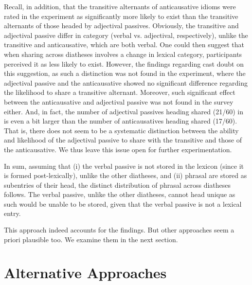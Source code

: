 \documentclass[output=paper]{langsci/langscibook}
\begin{document}
Recall, in addition, that the transitive alternants of anticausative idioms
were rated in the  experiment as significantly more likely to exist than
the transitive alternants of those headed by adjectival passives. Obviously,
the transitive and adjectival passive differ in category (verbal vs.
adjectival, respectively), unlike the transitive and anticausative, which are
both verbal. One could then suggest that when sharing across diatheses involves
a change in lexical category, participants perceived it as less likely to
exist. However, the findings regarding  cast doubt on this
suggestion, as such a distinction was not found in the  experiment,
where the adjectival passive and the anticausative showed no significant
difference regarding the likelihood to share a transitive alternant. Moreover,
such significant effect between the anticausative and adjectival passive was
not found in the  survey either. And, in fact, the number of adjectival
passives heading shared  (21/60) in  is even a bit larger than the
number of anticausatives heading shared  (17/60). That is, there does not
seem to be a systematic distinction between the ability and likelihood of the
adjectival passive to share  with the transitive and those of the
anticausative. We thus leave this issue open for further experimentation.

In sum, assuming that (i) the verbal passive is not stored in the lexicon
(since it is formed post-lexically), unlike the other diatheses, and (ii)
phrasal  are stored as subentries of their head, the distinct
distribution of phrasal  across diatheses follows. The verbal passive,
unlike the other diatheses, cannot head unique  as such  would be
unable to be stored, given that the verbal passive is not a lexical entry.

This approach indeed accounts for the findings. But other approaches seem a
priori plausible too. We examine them in the next section.

\section{Alternative Approaches}\label{sec:key:20.5} %
\end{document}
